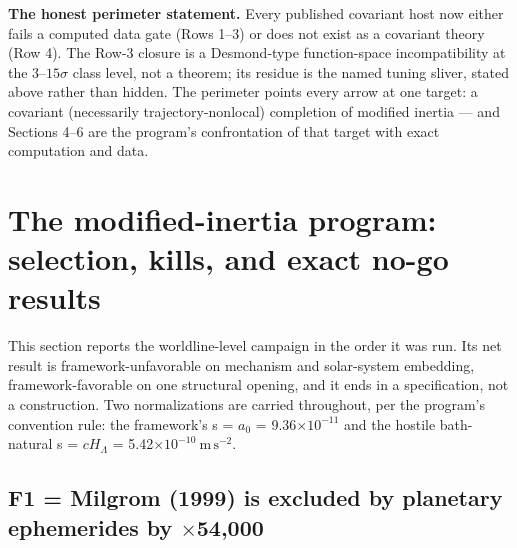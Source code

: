 \documentclass[11pt,a4paper]{article}
\begin{document}
\textbf{The honest perimeter statement.} Every published covariant host now either fails a computed data gate (Rows 1--3) or does not exist as a covariant theory (Row 4). The Row-3 closure is a Desmond-type function-space incompatibility at the $3$--$15\sigma$ class level, not a theorem; its residue is the named tuning sliver, stated above rather than hidden. The perimeter points every arrow at one target: a covariant (necessarily trajectory-nonlocal) completion of modified inertia --- and Sections 4--6 are the program's confrontation of that target with exact computation and data.

\section{The modified-inertia program: selection, kills, and exact no-go results}

This section reports the worldline-level campaign in the order it was run. Its net result is framework-unfavorable on mechanism and solar-system embedding, framework-favorable on one structural opening, and it ends in a specification, not a construction. Two normalizations are carried throughout, per the program's convention rule: the framework's s = $a_{0}$ = 9.36$\times10^{-11}$ and the hostile bath-natural s = $cH_\Lambda$ = 5.42$\times10^{-10}\ \mathrm{m\,s^{-2}}$.

\subsection{\texorpdfstring{F1 = Milgrom (1999) is excluded by planetary ephemerides by $\times$54,000}{F1 = Milgrom (1999) is excluded by planetary ephemerides by x54,000}}
\end{document}
